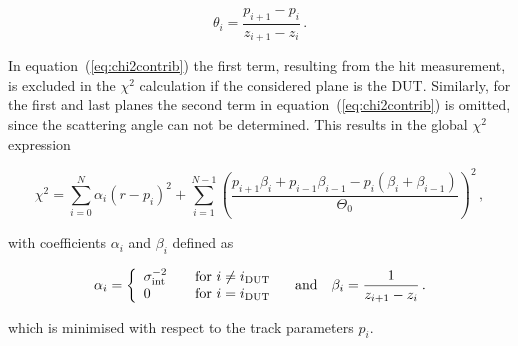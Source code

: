 \begin{equation}
\theta_i = \frac{p_{i+1} - p_i}{z_{i+1} - z_i} \,.
\end{equation}

\noindent In equation~(\ref{eq:chi2contrib}) the first term, resulting from the hit measurement, is excluded in the $\chi^2$ calculation if the considered plane is the DUT.
Similarly, for the first and last planes the second term in equation~(\ref{eq:chi2contrib}) is omitted, since the scattering angle can not be determined.
This results in the global $\chi^2$ expression

\begin{equation}
\label{eq:globalchi2}
\chi^2 = \sum_{i=0}^{N} \alpha_i \left( r - p_i \right)^2 + \sum_{i=1}^{N-1}
\left( \frac{p_{i + 1} \beta_i + p_{i-1} \beta_{i-1} - p_i \left( \beta_i + \beta_{i-1} \right)}{\Theta_0} \right)^2 \,,
\end{equation}

\noindent
with coefficients $\alpha_i$ and $\beta_i$ defined as~\cite{ref:eudetmemo_2007_01}

\begin{equation}
\alpha_i = \left\{
  \begin{array}{l l}
    \sigma_{\textrm{int}}^{-2} & \quad \text{for $i \neq i_{\textrm{DUT}}$}\\
    0 & \quad \text{for $i = i_{\textrm{DUT}}$}
  \end{array} \right. \quad \text{and} \quad \beta_i = \frac{1}{z_{i + 1} - z_i} \,.
\end{equation}

\noindent
which is minimised with respect to the track parameters $p_i$. 
